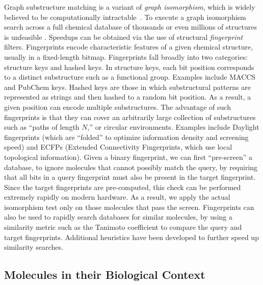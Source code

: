 \documentclass{sig-alternate}
\begin{document}
Graph substructure matching is a variant of \emph{graph isomorphism},
which is widely believed to be computationally
intractable~\cite{cordella2001}. To execute a graph isomorphism search
across a full chemical database of thousands or even millions of
structures is unfeasible \cite{Weininger:2011ly}. Speedups can be
obtained via the use of structural \emph{fingerprint}
filters. Fingerprints encode characteristic features of a given
chemical structure, usually in a fixed-length bitmap. Fingerprints
fall broadly into two categories: structure keys and hashed keys. In
structure keys, each bit position corresponds to a distinct
substructure such as a functional group. Examples include MACCS and
PubChem keys. Hashed keys are those in which substructural patterns
are represented as strings and then hashed to a random bit
position. As a result, a given position can encode multiple
substructures. The advantage of such fingerprints is that they can
cover an arbitrarily large collection of substructures such as ``paths
of length $N$,'' or circular environments. Examples include Daylight
fingerprints (which are ``folded'' to optimize information density and
screening speed) and ECFPs (Extended Connectivity Fingerprints, which
use local topological information).  Given a binary fingerprint, we
can first ``pre-screen'' a database, to ignore molecules that cannot
possibly match the query, by requiring that all bits in a query
fingerprint must also be present in the target fingerprint. Since the
target fingerprints are pre-computed, this check can be performed
extremely rapidly on modern hardware. As a result, we apply the actual
isomorphism test only on those molecules that pass the
screen. Fingerprints can also be used to rapidly search databases for
similar molecules, by using a similarity metric such as the Tanimoto
coefficient to compare the query and target fingerprints. Additional
heuristics have been developed \cite{Swamidass:2007ve} to further
speed up similarity searches.

\subsection{Molecules in their Biological Context}
\label{sec:prof-ident}
\end{document}
